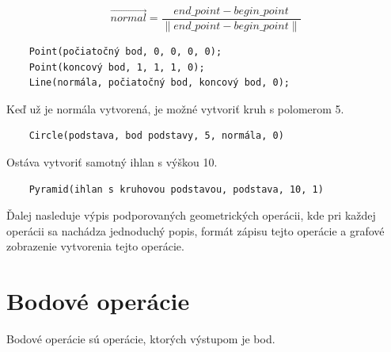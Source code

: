 \begin{equation}
    \overrightarrow{normal}=
    \frac{end\_point - begin\_point}{
    \left \|  end\_point - begin\_point \right \|}
\label{eq:normalizacia_usecky}
\end{equation}
\begin{lstlisting}
    Point(počiatočný bod, 0, 0, 0, 0);
    Point(koncový bod, 1, 1, 1, 0);
    Line(normála, počiatočný bod, koncový bod, 0);
\end{lstlisting}
Keď už je normála vytvorená, je možné vytvoriť kruh s polomerom 5.
\begin{lstlisting}
    Circle(podstava, bod podstavy, 5, normála, 0) 
\end{lstlisting}
Ostáva vytvoriť samotný ihlan s výškou 10.
\begin{lstlisting}
    Pyramid(ihlan s kruhovou podstavou, podstava, 10, 1)
\end{lstlisting}



Ďalej nasleduje výpis podporovaných geometrických operácii, kde pri každej operácii sa nachádza jednoduchý popis, formát zápisu tejto operácie a grafové zobrazenie vytvorenia tejto operácie.


\section{Bodové operácie}
Bodové operácie sú operácie, ktorých výstupom je bod.
